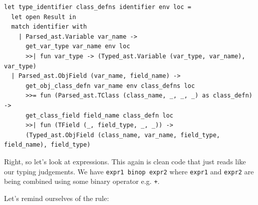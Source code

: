 {{%
%
\begin{lstlisting}[language=caml,caption={{type\_expr.ml}}]
let type_identifier class_defns identifier env loc =
  let open Result in
  match identifier with
    | Parsed_ast.Variable var_name ->
      get_var_type var_name env loc
      >>| fun var_type -> (Typed_ast.Variable (var_type, var_name), var_type)
  | Parsed_ast.ObjField (var_name, field_name) ->
      get_obj_class_defn var_name env class_defns loc
      >>= fun (Parsed_ast.TClass (class_name, _, _, _) as class_defn) ->
      get_class_field field_name class_defn loc
      >>| fun (TField (_, field_type, _, _)) ->
      (Typed_ast.ObjField (class_name, var_name, field_type, field_name), field_type)
\end{lstlisting}

Right, so let's look at expressions. This again is clean code that just
reads like our typing judgements. We have \texttt{expr1\ binop\ expr2}
where \texttt{expr1} and \texttt{expr2} are being combined using some
binary operator e.g. \texttt{+}.

Let's remind ourselves of the rule:

{{}}

}}
